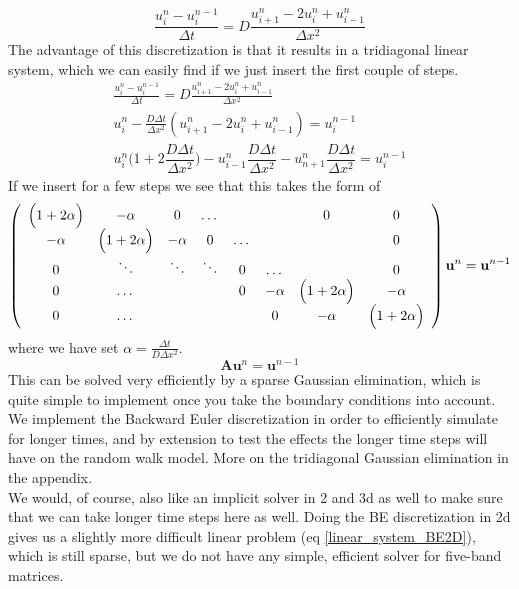 \begin{equation}\label{BE_discretisation_isotropic}
 \frac{u^n_i - u^{n-1}_i}{\Delta t} = D\frac{u^n_{i+1}-2u^n_i +u^n_{i-1}}{\Delta x^2}
\end{equation}
The advantage of this discretization is that it results in a tridiagonal linear system, which we can easily find if we just insert the first couple of steps.
\begin{align*}
 \frac{u^{n}_i-u^{n-1}_i}{\Delta t} = D\frac{u^n_{i+1}-2u^n_i + u^n_{i-1}}{\Delta x^2} \\
 u^n_i -\frac{D\Delta t}{\Delta x^2}\left(u^n_{i+1}-2u^n_i + u^n_{i-1}\right) = u^{n-1}_i \\
 u^n_i\Big(1+2\dfrac{D\Delta t}{\Delta x^2}\Big) -u^n_{i-1}\dfrac{D\Delta t}{\Delta x^2} - u^n_{n+1}\dfrac{D\Delta t}{\Delta x^2} 
 = u^{n-1}_i
\end{align*}
If we insert for a few steps we see that this takes the form of
\begin{align*}\label{BE}
 \left(\begin{array}{c c c c c c c c}
        \Big(1+2\alpha\Big) & -\alpha &0 &\dots & & &0 &0 \\
        -\alpha & \Big(1+2\alpha\Big) & -\alpha &0 &\dots & & &0 \\
        0& \ddots & \ddots & \ddots & 0 & \dots &  &0\\
        0& \dots & & &0&-\alpha & \Big(1+2\alpha\Big) & -\alpha\\
         0& \dots & && &0&-\alpha & \Big(1+2\alpha\Big) 
       \end{array}\right)\mathbf{u}^n = \mathbf{u}^{n-1} 
\end{align*}
where we have set $\alpha = \frac{\Delta t}{D\Delta x^2}$.
\begin{equation*}
 \mathbf{A}\mathbf{u}^n = \mathbf{u}^{n-1}
\end{equation*}
This can be solved very efficiently by a sparse Gaussian elimination, which is quite simple to implement once you take the boundary conditions into account. 
We implement the Backward Euler discretization in order to efficiently simulate for longer times, and by extension to test the effects the longer time steps will have on the random walk model. More on the tridiagonal Gaussian elimination in the appendix.\\
We would, of course, also like an implicit solver in 2 and 3d as well to make sure that we can take longer time steps here as well. 
Doing the BE discretization in 2d gives us a slightly more difficult linear problem (eq \ref{linear_system_BE2D}), which is still sparse, but we do not have any simple, efficient solver for five-band matrices. 
